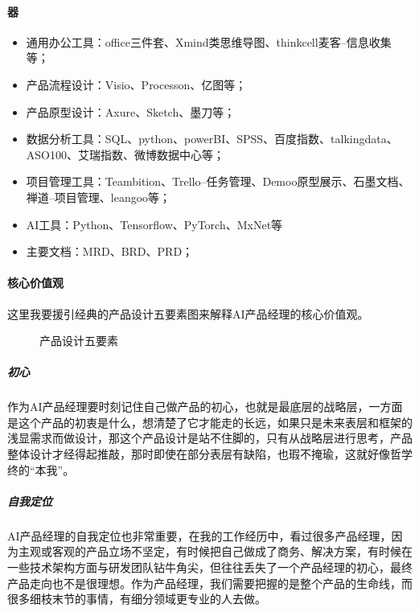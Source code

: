 \documentclass[letterpaper,11pt,english]{sphinxmanual}
\begin{document}
\paragraph{器}
\label{\detokenize{chapter_introduction/ability:id11}}\begin{itemize}
\item {} 
通用办公工具：office三件套、Xmind类思维导图、think\sphinxhyphen{}cell麦客–信息收集等；

\item {} 
产品流程设计：Visio、Processon、亿图等；

\item {} 
产品原型设计：Axure、Sketch、墨刀等；

\item {} 
数据分析工具：SQL、python、powerBI、SPSS、百度指数、talkingdata、ASO100、艾瑞指数、微博数据中心等；

\item {} 
项目管理工具：Teambition、Trello–任务管理、Demoo\sphinxhyphen{}原型展示、石墨文档、禅道–项目管理、leangoo等；

\item {} 
AI工具：Python、Tensorflow、PyTorch、MxNet等

\item {} 
主要文档：MRD、BRD、PRD；

\end{itemize}


\paragraph{核心价值观}
\label{\detokenize{chapter_introduction/ability:id12}}
这里我要援引经典的产品设计五要素图来解释AI产品经理的核心价值观。

\begin{figure}[H]
\centering
\capstart

\noindent{}
\caption{产品设计五要素}\label{\detokenize{chapter_introduction/ability:id17}}\end{figure}


\subparagraph{初心}
\label{\detokenize{chapter_introduction/ability:id13}}
作为AI产品经理要时刻记住自己做产品的初心，也就是最底层的战略层，一方面是这个产品的初衷是什么，想清楚了它才能走的长远，如果只是未来表层和框架的浅显需求而做设计，那这个产品设计是站不住脚的，只有从战略层进行思考，产品整体设计才经得起推敲，那时即使在部分表层有缺陷，也瑕不掩瑜，这就好像哲学终的“本我”。


\subparagraph{自我定位}
\label{\detokenize{chapter_introduction/ability:id14}}
AI产品经理的自我定位也非常重要，在我的工作经历中，看过很多产品经理，因为主观或客观的产品立场不坚定，有时候把自己做成了商务、解决方案，有时候在一些技术架构方面与研发团队钻牛角尖，但往往丢失了一个产品经理的初心，最终产品走向也不是很理想。作为产品经理，我们需要把握的是整个产品的生命线，而很多细枝末节的事情，有细分领域更专业的人去做。
\end{document}
